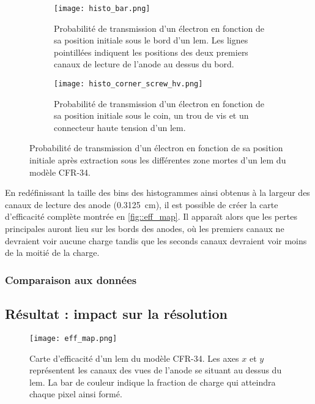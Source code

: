             \begin{figure}[htbp]
                \begin{subfigure}[t]{0.48\textwidth}
                    \texttt{[image: histo\_bar.png]}
                    \caption{Probabilité de transmission d'un électron en fonction de sa position initiale sous le bord d'un \gls{lem}. Les lignes pointillées indiquent les positions des deux premiers canaux de lecture de l'anode au dessus du bord.}
                \end{subfigure}
                \hfill
                \begin{subfigure}[t]{0.48\textwidth}
                    \texttt{[image: histo\_corner\_screw\_hv.png]}
                    \caption{Probabilité de transmission d'un électron en fonction de sa position initiale sous le coin, un trou de vis et un connecteur haute tension d'un \gls{lem}.}
                \end{subfigure}
                \caption[Probabilité de transmission des zones mortes d'un \gls{lem}.]{Probabilité de transmission d'un électron en fonction de sa position initiale après extraction sous les différentes zone mortes d'un \gls{lem} du modèle CFR-34.}
                \label{fig::histo_eff}
            \end{figure}
            
            En redéfinissant la taille des bins des histogrammes ainsi obtenus à la largeur des canaux de lecture des anode (\SI{0.3125}{\centi\meter}), il est possible de créer la carte d'efficacité complète montrée en \autoref{fig::eff_map}. Il apparaît alors que les pertes principales auront lieu sur les bords des anodes, où les premiers canaux ne devraient voir aucune charge tandis que les seconds canaux devraient voir moins de la moitié de la charge.
            
            \subsubsection{Comparaison aux données}
            
            
        \subsection{Résultat : impact sur la résolution}
            
            \begin{wrapfigure}{r}{0.4\textwidth}
                \texttt{[image: eff\_map.png]}
                \caption[Carte d'efficacité d'un \gls{lem} du modèle CFR-34.]{Carte d'efficacité d'un \gls{lem} du modèle CFR-34. Les axes $x$ et $y$ représentent les  canaux des vues de l'anode se situant au dessus du \gls{lem}. La bar de couleur indique la fraction de charge qui atteindra chaque pixel ainsi formé.}
                \label{fig::eff_map}
            \end{wrapfigure}
        
